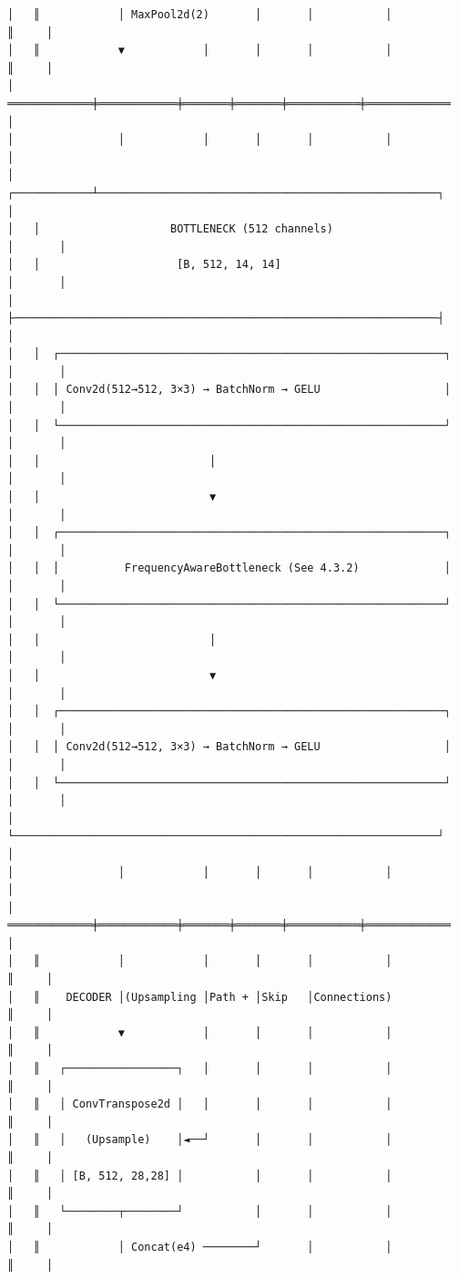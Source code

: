 \begin{verbatim}
│   ║            │ MaxPool2d(2)       │       │           │             ║     │
│   ║            ▼            │       │       │           │             ║     │
│   ═════════════╪════════════╪═══════╪═══════╪═══════════╪═════════════      │
│                │            │       │       │           │                   │
│   ┌────────────┴────────────────────────────────────────────────────┐       │
│   │                    BOTTLENECK (512 channels)                    │       │
│   │                     [B, 512, 14, 14]                            │       │
│   ├─────────────────────────────────────────────────────────────────┤       │
│   │  ┌───────────────────────────────────────────────────────────┐  │       │
│   │  │ Conv2d(512→512, 3×3) → BatchNorm → GELU                   │  │       │
│   │  └───────────────────────────────────────────────────────────┘  │       │
│   │                          │                                      │       │
│   │                          ▼                                      │       │
│   │  ┌───────────────────────────────────────────────────────────┐  │       │
│   │  │          FrequencyAwareBottleneck (See 4.3.2)             │  │       │
│   │  └───────────────────────────────────────────────────────────┘  │       │
│   │                          │                                      │       │
│   │                          ▼                                      │       │
│   │  ┌───────────────────────────────────────────────────────────┐  │       │
│   │  │ Conv2d(512→512, 3×3) → BatchNorm → GELU                   │  │       │
│   │  └───────────────────────────────────────────────────────────┘  │       │
│   └─────────────────────────────────────────────────────────────────┘       │
│                │            │       │       │           │                   │
│   ═════════════╪════════════╪═══════╪═══════╪═══════════╪═════════════      │
│   ║            │            │       │       │           │             ║     │
│   ║    DECODER │(Upsampling │Path + │Skip   │Connections)             ║     │
│   ║            ▼            │       │       │           │             ║     │
│   ║   ┌─────────────────┐   │       │       │           │             ║     │
│   ║   │ ConvTranspose2d │   │       │       │           │             ║     │
│   ║   │   (Upsample)    │◄──┘       │       │           │             ║     │
│   ║   │ [B, 512, 28,28] │           │       │           │             ║     │
│   ║   └────────┬────────┘           │       │           │             ║     │
│   ║            │ Concat(e4) ────────┘       │           │             ║     │

\end{verbatim}
